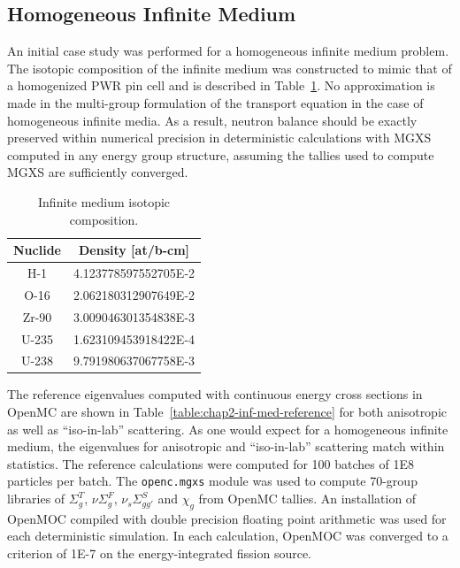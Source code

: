 \subsection{Homogeneous Infinite Medium}
\label{subsec:chap4-inf-medium}

An initial case study was performed for a homogeneous infinite medium problem. The isotopic composition of the infinite medium was constructed to mimic that of a homogenized \ac{PWR} pin cell and is described in Table~\ref{table:chap2-inf-med-isotopes}. No approximation is made in the multi-group formulation of the transport equation in the case of homogeneous infinite media. As a result, neutron balance should be exactly preserved within numerical precision in deterministic calculations with \ac{MGXS} computed in any energy group structure, assuming the tallies used to compute \ac{MGXS} are sufficiently converged.

\begin{table}[h!]
  \centering
  \caption{Infinite medium isotopic composition.}
  \label{table:chap2-inf-med-isotopes} 
  \vspace{14pt}
  \begin{tabular}{c c}
  \toprule
  \multicolumn{1}{c}{\bf Nuclide} &
  \multicolumn{1}{c}{\bf Density [at/b-cm]} \\
  \midrule
  H-1 &   4.123778597552705E-2 \\
  O-16 &  2.062180312907649E-2 \\
  Zr-90 & 3.009046301354838E-3 \\
  U-235 & 1.623109453918422E-4 \\
  U-238 & 9.791980637067758E-3 \\
  \bottomrule
\end{tabular}
\end{table}

The reference eigenvalues computed with continuous energy cross sections in OpenMC are shown in Table~\ref{table:chap2-inf-med-reference} for both anisotropic as well as ``iso-in-lab'' scattering. As one would expect for a homogeneous infinite medium, the eigenvalues for anisotropic and ``iso-in-lab'' scattering match within statistics.  The reference calculations were computed for 100 batches of 1E8 particles per batch. The \texttt{openc.mgxs} module was used to compute 70-group libraries of $\Sigma^T_g$, $\nu\Sigma^F_g$, $\nu_s\Sigma^S_{gg'}$ and $\chi_g$ from OpenMC tallies. An installation of OpenMOC compiled with double precision floating point arithmetic was used for each deterministic simulation. In each calculation, OpenMOC was converged to a criterion of 1E-7 on the energy-integrated fission source.

